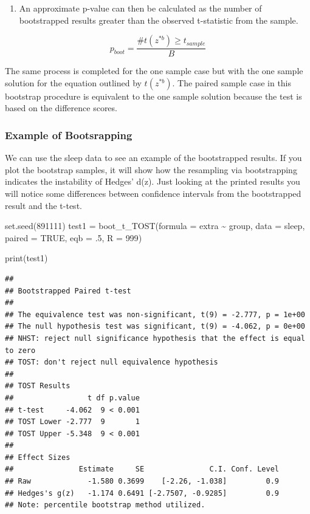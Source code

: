 \documentclass[]{interact}
\theoremstyle{plain}%
\theoremstyle{definition}
\theoremstyle{remark}
\newenvironment{Shaded}{\begin{snugshade}}{\end{snugshade}}
\newcommand{\AttributeTok}[1]{\textcolor[rgb]{0.77,0.63,0.00}{#1}}
\newcommand{\ConstantTok}[1]{\textcolor[rgb]{0.00,0.00,0.00}{#1}}
\newcommand{\DecValTok}[1]{\textcolor[rgb]{0.00,0.00,0.81}{#1}}
\newcommand{\FunctionTok}[1]{\textcolor[rgb]{0.00,0.00,0.00}{#1}}
\newcommand{\NormalTok}[1]{#1}
\newcommand{\OtherTok}[1]{\textcolor[rgb]{0.56,0.35,0.01}{#1}}
\newcommand{\SpecialCharTok}[1]{\textcolor[rgb]{0.00,0.00,0.00}{#1}}
\providecommand{\tightlist}{%
  \setlength{\itemsep}{0pt}\setlength{\parskip}{0pt}}
\def\tightlist{}
\begin{document}
\begin{enumerate}
\def\labelenumi{\arabic{enumi}.}
\setcounter{enumi}{2}
\tightlist
\item
  An approximate p-value can then be calculated as the number of
  bootstrapped results greater than the observed t-statistic from the
  sample.
\end{enumerate}

\[
p_{boot} = \frac {\#t(z^{*b}) \ge t_{sample}}{B}
\]

The same process is completed for the one sample case but with the one
sample solution for the equation outlined by \(t(z^{*b})\). The paired
sample case in this bootstrap procedure is equivalent to the one sample
solution because the test is based on the difference scores.

\newpage

\hypertarget{example-of-bootsrapping}{%
\subsubsection{Example of Bootsrapping}\label{example-of-bootsrapping}}

We can use the sleep data to see an example of the bootstrapped results.
If you plot the bootstrap samples, it will show how the resampling via
bootstrapping indicates the instability of Hedges' d(z). Just looking at
the printed results you will notice some differences between confidence
intervals from the bootstrapped result and the t-test.

\begin{Shaded}
\begin{Highlighting}[]
\FunctionTok{set.seed}\NormalTok{(}\DecValTok{891111}\NormalTok{)}
\NormalTok{test1 }\OtherTok{=} \FunctionTok{boot\_t\_TOST}\NormalTok{(}\AttributeTok{formula =}\NormalTok{ extra }\SpecialCharTok{\textasciitilde{}}\NormalTok{ group,}
                    \AttributeTok{data =}\NormalTok{ sleep,}
                    \AttributeTok{paired =} \ConstantTok{TRUE}\NormalTok{,}
                    \AttributeTok{eqb =}\NormalTok{ .}\DecValTok{5}\NormalTok{,}
                    \AttributeTok{R =} \DecValTok{999}\NormalTok{)}


\FunctionTok{print}\NormalTok{(test1)}
\end{Highlighting}
\end{Shaded}

\begin{verbatim}
## 
## Bootstrapped Paired t-test
## 
## The equivalence test was non-significant, t(9) = -2.777, p = 1e+00
## The null hypothesis test was significant, t(9) = -4.062, p = 0e+00
## NHST: reject null significance hypothesis that the effect is equal to zero 
## TOST: don't reject null equivalence hypothesis
## 
## TOST Results 
##                 t df p.value
## t-test     -4.062  9 < 0.001
## TOST Lower -2.777  9       1
## TOST Upper -5.348  9 < 0.001
## 
## Effect Sizes 
##               Estimate     SE               C.I. Conf. Level
## Raw             -1.580 0.3699    [-2.26, -1.038]         0.9
## Hedges's g(z)   -1.174 0.6491 [-2.7507, -0.9285]         0.9
## Note: percentile bootstrap method utilized.
\end{verbatim}
\end{document}
